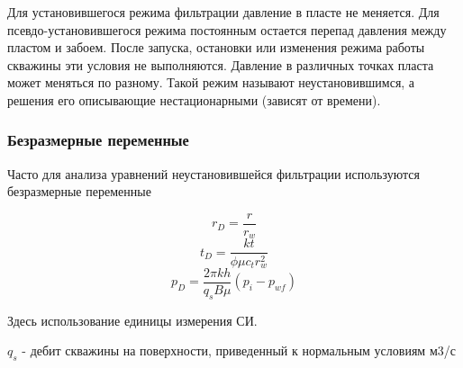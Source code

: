 Для установившегося режима фильтрации давление в пласте не меняется. Для псевдо-установившегося режима постоянным остается перепад давления между пластом и забоем. После запуска, остановки или изменения режима работы скважины эти условия не выполняются. Давление в различных точках пласта может меняться по разному. Такой режим называют неустановившимся, а решения его описывающие нестационарными (зависят от времени).

\subsubsection{Безразмерные переменные}

Часто для анализа уравнений неустановившейся фильтрации используются безразмерные переменные 


$$ r_D = \frac{r}{r_w} $$
$$ t_D = \frac{kt}{\phi \mu c_t r_w^2}$$
$$ p_D = \frac{2 \pi kh}{q_s B \mu} \left( p_i - p_{wf} \right) $$

Здесь использование единицы измерения СИ. 

$q_s$ - дебит скважины на поверхности, приведенный к нормальным условиям м3/с

